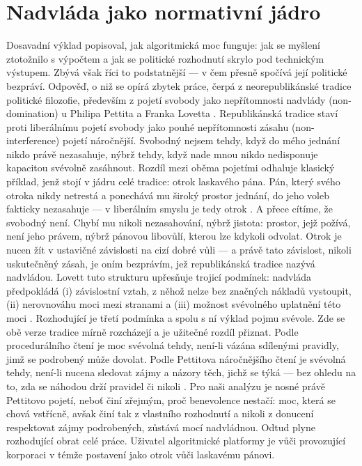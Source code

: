 \section{Nadvláda jako normativní jádro}
Dosavadní výklad popisoval, jak algoritmická moc funguje: jak se myšlení ztotožnilo s výpočtem a jak se politické rozhodnutí skrylo pod technickým výstupem.
Zbývá však říci to podstatnější — v čem přesně spočívá její politické bezpráví.
Odpověď, o niž se opírá zbytek práce, čerpá z neorepublikánské tradice politické filozofie, především z pojetí svobody jako nepřítomnosti nadvlády (non-domination) u Philipa Pettita a Franka Lovetta \parencite{Pettit97,Pettit12,Lovett10}.
Republikánská tradice staví proti liberálnímu pojetí svobody jako pouhé nepřítomnosti zásahu (non-interference) pojetí náročnější.
Svobodný nejsem tehdy, když do mého jednání nikdo právě nezasahuje, nýbrž tehdy, když nade mnou nikdo nedisponuje kapacitou svévolně zasáhnout.
Rozdíl mezi oběma pojetími odhaluje klasický příklad, jenž stojí v jádru celé tradice: otrok laskavého pána. Pán, který svého otroka nikdy netrestá a ponechává mu široký prostor jednání, do jeho voleb fakticky nezasahuje — v liberálním smyslu je tedy otrok .
A přece cítíme, že svobodný není. Chybí mu nikoli nezasahování, nýbrž jistota: prostor, jejž požívá, není jeho právem, nýbrž pánovou libovůlí, kterou lze kdykoli odvolat.
Otrok je nucen žít v ustavičné závislosti na cizí dobré vůli — a právě tato závislost, nikoli uskutečněný zásah, je oním bezprávím, jež republikánská tradice nazývá nadvládou.
Lovett tuto strukturu upřesňuje trojicí podmínek: nadvláda předpokládá (i) závislostní vztah, z něhož nelze bez značných nákladů vystoupit, (ii) nerovnováhu moci mezi stranami a (iii) možnost svévolného uplatnění této moci \parencite{Lovett10}.
Rozhodující je třetí podmínka a spolu s ní výklad pojmu svévole.
Zde se obě verze tradice mírně rozcházejí a je užitečné rozdíl přiznat.
Podle procedurálního čtení je moc svévolná tehdy, není-li vázána sdílenými pravidly, jimž se podrobený může dovolat.
Podle Pettitova náročnějšího čtení je svévolná tehdy, není-li nucena sledovat zájmy a názory těch, jichž se týká — bez ohledu na to, zda se náhodou drží pravidel či nikoli \parencite{Pettit97}.
Pro naši analýzu je nosné právě Pettitovo pojetí, neboť činí zřejmým, proč benevolence nestačí: moc, která se chová vstřícně, avšak činí tak z vlastního rozhodnutí a nikoli z donucení respektovat zájmy podrobených, zůstává mocí nadvládnou.
Odtud plyne rozhodující obrat celé práce. Uživatel algoritmické platformy je vůči provozující korporaci v témže postavení jako otrok vůči laskavému pánovi.
